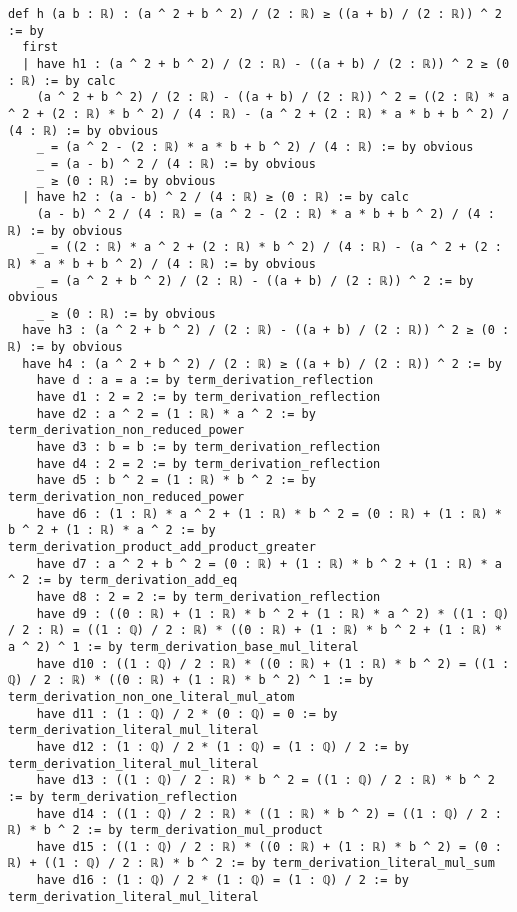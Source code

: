 \documentclass{article}
\begin{document}
\begin{tcolorbox}[colback=white!10, width=\linewidth]
\begin{lstlisting}[language=Lean4]
def h (a b : ℝ) : (a ^ 2 + b ^ 2) / (2 : ℝ) ≥ ((a + b) / (2 : ℝ)) ^ 2 := by
  first
  | have h1 : (a ^ 2 + b ^ 2) / (2 : ℝ) - ((a + b) / (2 : ℝ)) ^ 2 ≥ (0 : ℝ) := by calc
    (a ^ 2 + b ^ 2) / (2 : ℝ) - ((a + b) / (2 : ℝ)) ^ 2 = ((2 : ℝ) * a ^ 2 + (2 : ℝ) * b ^ 2) / (4 : ℝ) - (a ^ 2 + (2 : ℝ) * a * b + b ^ 2) / (4 : ℝ) := by obvious
    _ = (a ^ 2 - (2 : ℝ) * a * b + b ^ 2) / (4 : ℝ) := by obvious
    _ = (a - b) ^ 2 / (4 : ℝ) := by obvious
    _ ≥ (0 : ℝ) := by obvious
  | have h2 : (a - b) ^ 2 / (4 : ℝ) ≥ (0 : ℝ) := by calc
    (a - b) ^ 2 / (4 : ℝ) = (a ^ 2 - (2 : ℝ) * a * b + b ^ 2) / (4 : ℝ) := by obvious
    _ = ((2 : ℝ) * a ^ 2 + (2 : ℝ) * b ^ 2) / (4 : ℝ) - (a ^ 2 + (2 : ℝ) * a * b + b ^ 2) / (4 : ℝ) := by obvious
    _ = (a ^ 2 + b ^ 2) / (2 : ℝ) - ((a + b) / (2 : ℝ)) ^ 2 := by obvious
    _ ≥ (0 : ℝ) := by obvious
  have h3 : (a ^ 2 + b ^ 2) / (2 : ℝ) - ((a + b) / (2 : ℝ)) ^ 2 ≥ (0 : ℝ) := by obvious
  have h4 : (a ^ 2 + b ^ 2) / (2 : ℝ) ≥ ((a + b) / (2 : ℝ)) ^ 2 := by
    have d : a = a := by term_derivation_reflection
    have d1 : 2 = 2 := by term_derivation_reflection
    have d2 : a ^ 2 = (1 : ℝ) * a ^ 2 := by term_derivation_non_reduced_power
    have d3 : b = b := by term_derivation_reflection
    have d4 : 2 = 2 := by term_derivation_reflection
    have d5 : b ^ 2 = (1 : ℝ) * b ^ 2 := by term_derivation_non_reduced_power
    have d6 : (1 : ℝ) * a ^ 2 + (1 : ℝ) * b ^ 2 = (0 : ℝ) + (1 : ℝ) * b ^ 2 + (1 : ℝ) * a ^ 2 := by term_derivation_product_add_product_greater
    have d7 : a ^ 2 + b ^ 2 = (0 : ℝ) + (1 : ℝ) * b ^ 2 + (1 : ℝ) * a ^ 2 := by term_derivation_add_eq
    have d8 : 2 = 2 := by term_derivation_reflection
    have d9 : ((0 : ℝ) + (1 : ℝ) * b ^ 2 + (1 : ℝ) * a ^ 2) * ((1 : ℚ) / 2 : ℝ) = ((1 : ℚ) / 2 : ℝ) * ((0 : ℝ) + (1 : ℝ) * b ^ 2 + (1 : ℝ) * a ^ 2) ^ 1 := by term_derivation_base_mul_literal
    have d10 : ((1 : ℚ) / 2 : ℝ) * ((0 : ℝ) + (1 : ℝ) * b ^ 2) = ((1 : ℚ) / 2 : ℝ) * ((0 : ℝ) + (1 : ℝ) * b ^ 2) ^ 1 := by term_derivation_non_one_literal_mul_atom
    have d11 : (1 : ℚ) / 2 * (0 : ℚ) = 0 := by term_derivation_literal_mul_literal
    have d12 : (1 : ℚ) / 2 * (1 : ℚ) = (1 : ℚ) / 2 := by term_derivation_literal_mul_literal
    have d13 : ((1 : ℚ) / 2 : ℝ) * b ^ 2 = ((1 : ℚ) / 2 : ℝ) * b ^ 2 := by term_derivation_reflection
    have d14 : ((1 : ℚ) / 2 : ℝ) * ((1 : ℝ) * b ^ 2) = ((1 : ℚ) / 2 : ℝ) * b ^ 2 := by term_derivation_mul_product
    have d15 : ((1 : ℚ) / 2 : ℝ) * ((0 : ℝ) + (1 : ℝ) * b ^ 2) = (0 : ℝ) + ((1 : ℚ) / 2 : ℝ) * b ^ 2 := by term_derivation_literal_mul_sum
    have d16 : (1 : ℚ) / 2 * (1 : ℚ) = (1 : ℚ) / 2 := by term_derivation_literal_mul_literal

\end{lstlisting}
\end{tcolorbox}
\end{document}
